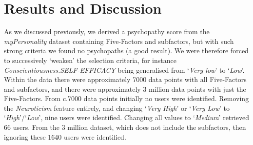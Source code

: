 \documentclass[conference]{IEEEtran}
\begin{document}
\section{Results and Discussion}\label{res}

As we discussed previously, we derived a psychopathy score from the
{\emph{myPersonality}} dataset containing Five-Factors and subfactors,
but with such strong criteria we found no psychopaths (a good
result). We were therefore forced to successively `weaken' the
selection criteria, for instance
{\emph{Conscientiousness.SELF-EFFICACY}} being generalised from
`{\emph{Very low}}' to `{\emph{Low}}'. Within the data there were
approximately 7000 data points with all Five-Factors and subfactors,
and there were approximately 3 million data points with just the
Five-Factors. From c.7000 data points initially no users were
identified. Removing the {\emph{Neuroticism}} feature entirely, and
changing `{\emph{Very High}}' or `{\emph{Very Low}}' to
`{\emph{High}}'/`{\emph{Low}}', nine users were identified. Changing
all values to `{\emph{Medium}}' retrieved 66 users. From the 3 million
dataset, which does not include the subfactors, then ignoring these
1640 users were identified.
\end{document}
